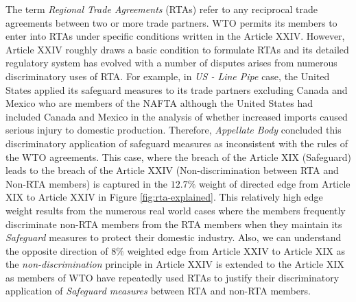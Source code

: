 The term \textit{Regional Trade Agreements} (RTAs)
refer to any reciprocal trade agreements between two or more trade partners.
WTO permits its members to enter into RTAs under specific conditions written in the Article XXIV.
However, Article XXIV roughly draws a basic condition to formulate RTAs and its
detailed regulatory system has evolved with a number of disputes arises
from numerous discriminatory uses of RTA. For example,
in \textit{US - Line Pipe} case,
the United States applied its safeguard measures to its trade partners excluding Canada and Mexico who are members of the NAFTA although
the United States had included Canada and Mexico in the analysis of whether increased imports caused serious injury to domestic production.
Therefore, \textit{Appellate Body} concluded this discriminatory application of safeguard measures as inconsistent with the rules of the WTO agreements.
This case, where the breach of the Article XIX (Safeguard) leads to the breach of the Article XXIV (Non-discrimination between RTA and Non-RTA members)
is captured in the $12.7\%$ weight of directed edge from Article XIX to Article XXIV in Figure \ref{fig:rta-explained}.
This relatively high edge weight results from the numerous real world cases where the members frequently discriminate non-RTA members from the RTA members when they maintain its \textit{Safeguard} measures to protect their domestic industry.
Also, we can understand the opposite direction of $8\%$ weighted edge from Article XXIV to Article XIX as the \textit{non-discrimination}
principle in Article XXIV is
extended to the Article XIX as members of WTO have repeatedly used RTAs to justify their discriminatory application of \textit{Safeguard measures} between RTA and non-RTA members.%
 
